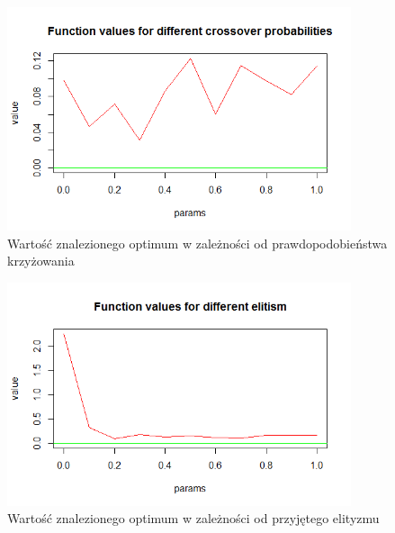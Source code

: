 \documentclass[11pt, a4paper]{article}
\begin{document}
\begin{figure}[H]
	\begin{center}
		\includegraphics[width=0.9\textwidth]{./assets/gulf3.png} %
		\caption{Wartość znalezionego optimum w zależności od prawdopodobieństwa krzyżowania}
		\label{fig:gulf3}
	\end{center}
\end{figure}

\begin{figure}[H]
	\begin{center}
		\includegraphics[width=0.9\textwidth]{./assets/gulf4.png} %
		\caption{Wartość znalezionego optimum w zależności od przyjętego elityzmu}
		\label{fig:gulf4}
	\end{center}
\end{figure}
\end{document}
